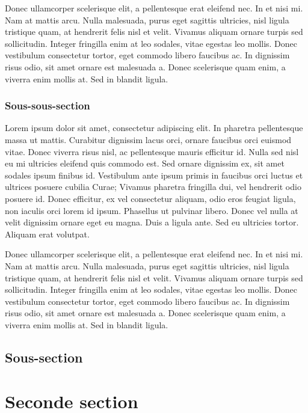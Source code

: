 \documentclass[a4paper, 11pt,twoside]{article} %
\begin{document}
  Donec ullamcorper scelerisque elit, a pellentesque erat eleifend nec. In et nisi mi. Nam at mattis arcu. Nulla malesuada, purus eget sagittis ultricies, nisl ligula tristique quam, at hendrerit felis nisl et velit. Vivamus aliquam ornare turpis sed sollicitudin. Integer fringilla enim at leo sodales, vitae egestas leo mollis. Donec vestibulum consectetur tortor, eget commodo libero faucibus ac. In dignissim risus odio, sit amet ornare est malesuada a. Donec scelerisque quam enim, a viverra enim mollis at. Sed in blandit ligula. 

    \subsubsection{Sous-sous-section}

  Lorem ipsum dolor sit amet, consectetur adipiscing elit. In pharetra pellentesque massa ut mattis. Curabitur dignissim lacus orci, ornare faucibus orci euismod vitae. Donec viverra risus nisl, ac pellentesque mauris efficitur id. Nulla sed nisl eu mi ultricies eleifend quis commodo est. Sed ornare dignissim ex, sit amet sodales ipsum finibus id. Vestibulum ante ipsum primis in faucibus orci luctus et ultrices posuere cubilia Curae; Vivamus pharetra fringilla dui, vel hendrerit odio posuere id. Donec efficitur, ex vel consectetur aliquam, odio eros feugiat ligula, non iaculis orci lorem id ipsum. Phasellus ut pulvinar libero. Donec vel nulla at velit dignissim ornare eget eu magna. Duis a ligula ante. Sed eu ultricies tortor. Aliquam erat volutpat.

  Donec ullamcorper scelerisque elit, a pellentesque erat eleifend nec. In et nisi mi. Nam at mattis arcu. Nulla malesuada, purus eget sagittis ultricies, nisl ligula tristique quam, at hendrerit felis nisl et velit. Vivamus aliquam ornare turpis sed sollicitudin. Integer fringilla enim at leo sodales, vitae egestas leo mollis. Donec vestibulum consectetur tortor, eget commodo libero faucibus ac. In dignissim risus odio, sit amet ornare est malesuada a. Donec scelerisque quam enim, a viverra enim mollis at. Sed in blandit ligula. 

  \subsection{Sous-section}

\section{Seconde section}
\end{document}
